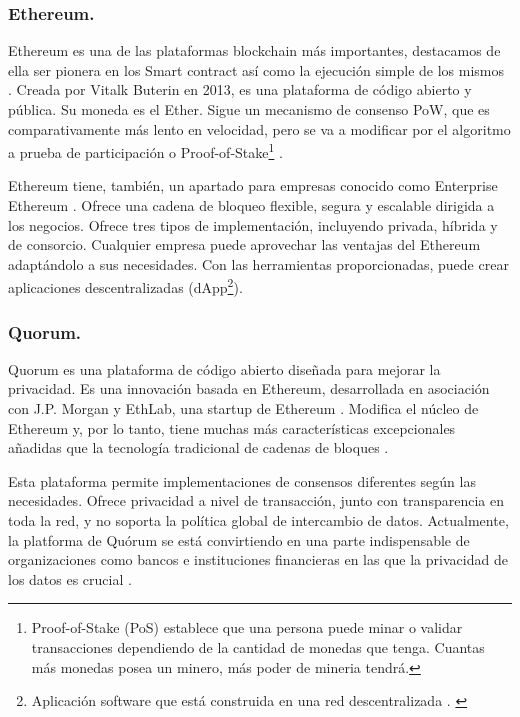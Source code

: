 \subsubsection*{Ethereum.}

Ethereum es una de las plataformas blockchain más importantes, destacamos de ella ser pionera en los Smart contract así 
como la ejecución simple de los mismos \cite{top-blockchain-platforms-app}. Creada por Vitalk Buterin en 2013, es una 
plataforma de código abierto y pública. Su moneda es el Ether. Sigue un mecanismo de consenso PoW, que es 
comparativamente más lento en velocidad, pero se va a modificar por el algoritmo a prueba de participación o 
Proof-of-Stake\footnote{Proof-of-Stake (PoS) establece que una persona puede minar o validar transacciones dependiendo 
de la cantidad de monedas que tenga. Cuantas más monedas posea un minero, más poder de mineria tendrá.\label{fnlabel}} 
\cite{proof-of-stake}.

\vspace{5mm}

\noindent Ethereum tiene, también, un apartado para empresas conocido como Enterprise Ethereum 
\cite{top-blockchain-platforms}. Ofrece una cadena de bloqueo flexible, segura y escalable dirigida a los negocios. 
Ofrece tres tipos de implementación, incluyendo privada, híbrida y de consorcio. Cualquier empresa puede aprovechar 
las ventajas del Ethereum adaptándolo a sus necesidades. Con las herramientas proporcionadas, puede crear aplicaciones 
descentralizadas (dApp\footnote{Aplicación software que está construida en una red descentralizada \cite{what-is-dapp}.
\label{fnlabel}}). 

\subsubsection*{Quorum.}

Quorum es una plataforma de código abierto diseñada para mejorar la privacidad. Es una innovación basada en Ethereum, 
desarrollada en asociación con J.P. Morgan y EthLab, una startup de Ethereum . Modifica el núcleo de Ethereum y, por lo 
tanto, tiene muchas más características excepcionales añadidas que la tecnología tradicional de cadenas de bloques 
\cite{top-blockchain-platforms-app}. 

\vspace{5mm}

\noindent Esta plataforma permite implementaciones de consensos diferentes según las necesidades. Ofrece privacidad a 
nivel de transacción, junto con transparencia en toda la red, y no soporta la política global de intercambio de datos. 
Actualmente, la platforma de Quórum se está convirtiendo en una parte indispensable de organizaciones como bancos e 
instituciones financieras en las que la privacidad de los datos es crucial \cite{top-blockchain-platforms-app}.

